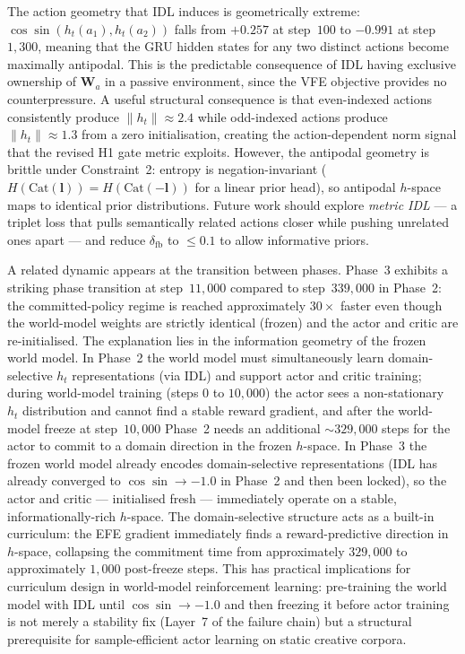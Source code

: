 \documentclass[journal,onecolumn,11pt]{IEEEtran}
\begin{document}
The action geometry that IDL induces is geometrically extreme:
$\cos\!\sin(h_t(a_1), h_t(a_2))$ falls from $+0.257$ at step~$100$ to
$-0.991$ at step~$1{,}300$, meaning that the GRU hidden states for any two
distinct actions become maximally antipodal.
This is the predictable consequence of IDL having exclusive ownership of
$\mathbf{W}_a$ in a passive environment, since the VFE objective provides no
counterpressure.
A useful structural consequence is that even-indexed actions consistently
produce $\|h_t\| \approx 2.4$ while odd-indexed actions produce
$\|h_t\| \approx 1.3$ from a zero initialisation, creating the
action-dependent norm signal that the revised H1 gate metric exploits.
However, the antipodal geometry is brittle under Constraint~2: entropy is
negation-invariant
($H(\text{Cat}(\mathbf{l})) = H(\text{Cat}(-\mathbf{l}))$ for a linear prior
head), so antipodal $h$-space maps to identical prior distributions.
Future work should explore \emph{metric IDL} --- a triplet loss that pulls
semantically related actions closer while pushing unrelated ones apart ---
and reduce $\delta_{\text{fb}}$ to $\leq 0.1$ to allow informative priors.

A related dynamic appears at the transition between phases.
Phase~3 exhibits a striking phase transition at step~$11{,}000$ compared to
step~$339{,}000$ in Phase~2: the committed-policy regime is reached
approximately $30\times$ faster even though the world-model weights are
strictly identical (frozen) and the actor and critic are re-initialised.
The explanation lies in the information geometry of the frozen world model.
In Phase~2 the world model must simultaneously learn domain-selective
$h_t$ representations (via IDL) and support actor and critic training; during
world-model training (steps $0$ to $10{,}000$) the actor sees a
non-stationary $h_t$ distribution and cannot find a stable reward gradient,
and after the world-model freeze at step~$10{,}000$ Phase~2 needs an
additional $\sim$$329{,}000$ steps for the actor to commit to a domain
direction in the frozen $h$-space.
In Phase~3 the frozen world model already encodes domain-selective
representations (IDL has already converged to
$\cos\!\sin \to -1.0$ in Phase~2 and then been locked), so the actor and
critic --- initialised fresh --- immediately operate on a stable,
informationally-rich $h$-space.
The domain-selective structure acts as a built-in curriculum: the EFE
gradient immediately finds a reward-predictive direction in $h$-space,
collapsing the commitment time from approximately $329{,}000$ to
approximately $1{,}000$ post-freeze steps.
This has practical implications for curriculum design in world-model
reinforcement learning: pre-training the world model with IDL until
$\cos\!\sin \to -1.0$ and then freezing it before actor training is not
merely a stability fix (Layer~7 of the failure chain) but a structural
prerequisite for sample-efficient actor learning on static creative
corpora.
\end{document}
